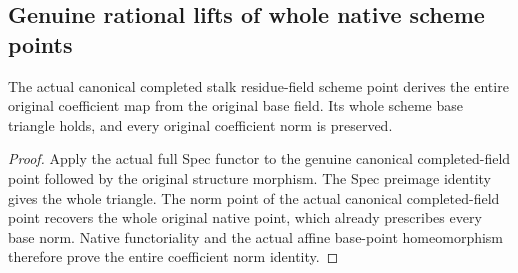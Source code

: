 \subsection{Genuine rational lifts of whole native scheme points}

\begin{lemma}
\label{lem:fc-rational-point-field-coefficients}
\leanok
{}
The actual canonical completed stalk residue-field scheme point derives
the entire original coefficient map from the original base field.
Its whole scheme base triangle holds, and every original coefficient
norm is preserved.
\end{lemma}
\begin{proof}
Apply the actual full Spec functor to the genuine canonical
completed-field point followed by the original structure morphism.
The Spec preimage identity gives the whole triangle. The norm point
of the actual canonical completed-field point recovers the whole
original native point, which already prescribes every base norm.
Native functoriality and the actual affine base-point homeomorphism
therefore prove the entire coefficient norm identity.
\end{proof}

